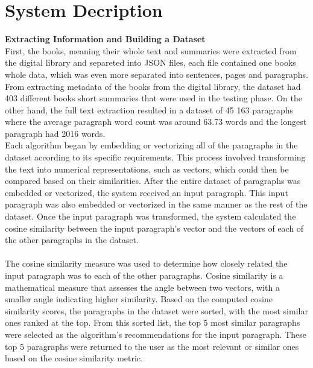 \documentclass{llncs}
\begin{document}
\section{System Decription}
\textbf{Extracting Information and Building a Dataset}\\
First, the books, meaning their whole text and summaries were extracted from the digital library and separeted into JSON files, each file contained one books whole data, which was even more separated into sentences, pages and paragraphs.\\
From extracting metadata of the books from the digital library, the dataset had 403 different books short summaries that were used in the testing phase. On the other hand, the full text extraction resulted in a dataset of 45 163 paragraphs where the average paragraph word count was around 63.73 words and the longest paragraph had 2016 words.\\
Each algorithm began by embedding or vectorizing all of the paragraphs in the dataset according to its specific requirements. This process involved transforming the text into numerical representations, such as vectors, which could then be compared based on their similarities. After the entire dataset of paragraphs was embedded or vectorized, the system received an input paragraph. This input paragraph was also embedded or vectorized in the same manner as the rest of the dataset. Once the input paragraph was transformed, the system calculated the cosine similarity between the input paragraph’s vector and the vectors of each of the other paragraphs in the dataset.\\\\
The cosine similarity measure was used to determine how closely related the input paragraph was to each of the other paragraphs. Cosine similarity is a mathematical measure that assesses the angle between two vectors, with a smaller angle indicating higher similarity. Based on the computed cosine similarity scores, the paragraphs in the dataset were sorted, with the most similar ones ranked at the top. From this sorted list, the top 5 most similar paragraphs were selected as the algorithm's recommendations for the input paragraph. These top 5 paragraphs were returned to the user as the most relevant or similar ones based on the cosine similarity metric.\\\\
\end{document}
